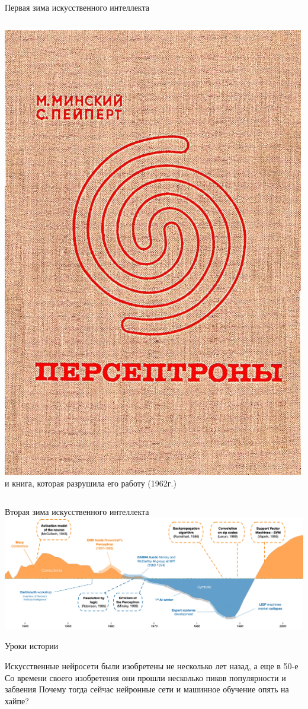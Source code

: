 \documentclass[aspectratio=169, professionalfonts]{beamer}
\begin{document}
\begin{frame}{Первая зима искусственного интеллекта}
\begin{columns}
\begin{column}{.49\linewidth}
            \includegraphics[width=.55\linewidth]{graphs/fig23_2.jpg} \\
            и книга, которая разрушила его работу (1962г.)
        \end{column}
    \end{columns}
\end{frame}

\begin{frame}{Вторая зима искусственного интеллекта}
    \centering
    \includegraphics[width=\linewidth]{graphs/fig22.jpg}
\end{frame}

\begin{frame}{Уроки истории}
    \large
    \begin{outline}
        \1 Искусственные нейросети были изобретены не несколько лет назад, а еще в 50-е
        \1 Со времени своего изобретения они прошли несколько пиков популярности и забвения
        \1 Почему тогда сейчас нейронные сети и машинное обучение опять на хайпе?
    \end{outline}
\end{frame}
\end{document}

